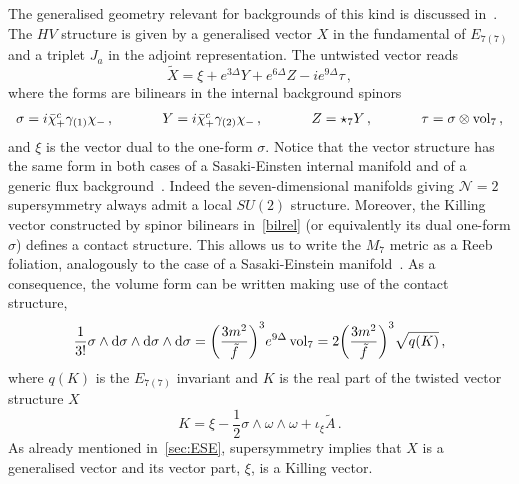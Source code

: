 \documentclass[debug]{phd}
\begin{document}
%
%
	The generalised geometry relevant for backgrounds of this kind is discussed in~\cite{AshmoreESE}. 
	The $HV$ structure is given by a generalised vector $X$ in the fundamental of $E_{7(7)}$ and a triplet $J_a$ in the adjoint representation. 
	The untwisted vector reads
		\begin{equation}
			\tilde{X}= \xi + e^{3\Delta} Y + e^{6\Delta} Z - i e^{9\Delta} \tau\, ,
		\end{equation}	
where the forms are bilinears in the internal background spinors 
		\begin{equation}
		\label{bilrel}
			\begin{array}{lcccccr}
				\sigma = i \bar{\chi}_+^c \gamma_{(1)} \chi_- \, , &\phantom{and}& Y = i \bar{\chi}_+^c \gamma_{(2)} \chi_- \, ,&\phantom{and}& Z=\star_7 Y \, ,& \phantom{and}& \tau = \sigma \otimes \operatorname{vol}_7\, ,
			\end{array}
		\end{equation}
and $\xi$ is the vector dual to the one-form $\sigma$. 
Notice that the vector structure has the same form in both cases of a Sasaki-Einsten internal manifold and of a generic flux background~\cite{AshmoreESE}. 
Indeed the seven-dimensional manifolds giving $\mathcal{N}=2$ supersymmetry always admit a local $SU(2)$ structure. 
Moreover, the Killing vector constructed by spinor bilinears in~\eqref{bilrel} (or equivalently its dual one-form $\sigma$) defines a contact structure.
This allows us to write the $M_7$ metric as a Reeb foliation, analogously to the case of a Sasaki-Einstein manifold~\cite{Gabella:2012rc}. 
As a consequence, the volume form can be written making use of the contact structure,
		\begin{equation}
			\dfrac{1}{3!} \sigma \wedge \dd  \sigma \wedge \dd  \sigma \wedge \dd  \sigma = \left(\dfrac{3m^2}{\tilde{f}}\right)^3 e^{9\Delta} \vol_7 = 2\left(\dfrac{3m^2}{\tilde{f}}\right)^3 \sqrt{q(K)}\, ,
		\end{equation}
where $q(K)$ is the $E_{7(7)}$ invariant and $K$ is the real part of the twisted vector structure $X$
		\begin{equation}
		\label{Kads4}
			K = \xi - \frac{1}{2} \sigma \wedge \omega \wedge \omega + \iota_\xi \tilde{A}\, .
		\end{equation}
As already mentioned in~\cref{sec:ESE}, supersymmetry implies that $X$ is a generalised vector and its vector part, $\xi$, is a Killing vector. 
\end{document}
